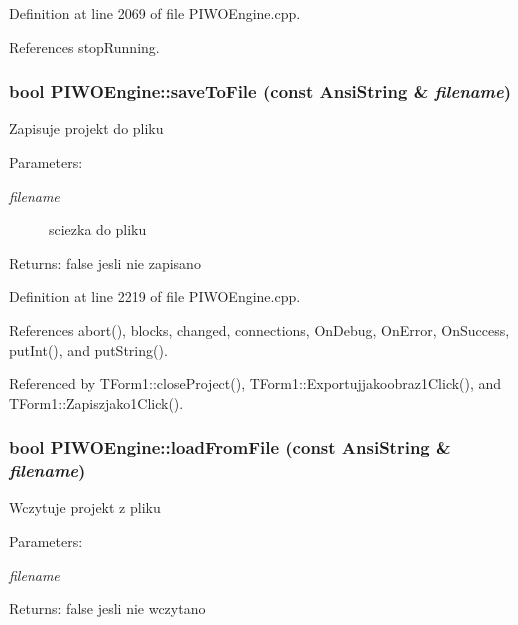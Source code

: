 Definition at line 2069 of file PIWOEngine.cpp.

References stopRunning.\hypertarget{classPIWOEngine_dee854cac7e50d95de9613e2bbdb4676}{
\subsubsection[saveToFile]{\setlength{\rightskip}{0pt plus 5cm}bool PIWOEngine::saveToFile (const AnsiString \& {\em filename})}}
\label{classPIWOEngine_dee854cac7e50d95de9613e2bbdb4676}


Zapisuje projekt do pliku \begin{Desc}
\item[Parameters:]
\begin{description}
\item[{\em filename}]sciezka do pliku \end{description}
\end{Desc}
\begin{Desc}
\item[Returns:]false jesli nie zapisano \end{Desc}


Definition at line 2219 of file PIWOEngine.cpp.

References abort(), blocks, changed, connections, OnDebug, OnError, OnSuccess, putInt(), and putString().

Referenced by TForm1::closeProject(), TForm1::Exportujjakoobraz1Click(), and TForm1::Zapiszjako1Click().\hypertarget{classPIWOEngine_84deceb11d30a25d104a2b34afad27d4}{
\subsubsection[loadFromFile]{\setlength{\rightskip}{0pt plus 5cm}bool PIWOEngine::loadFromFile (const AnsiString \& {\em filename})}}
\label{classPIWOEngine_84deceb11d30a25d104a2b34afad27d4}


Wczytuje projekt z pliku \begin{Desc}
\item[Parameters:]
\begin{description}
\item[{\em filename}]\end{description}
\end{Desc}
\begin{Desc}
\item[Returns:]false jesli nie wczytano \end{Desc}


